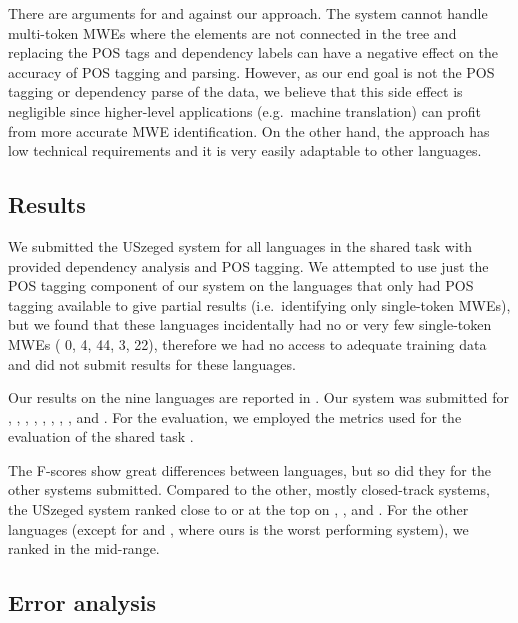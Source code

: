 \documentclass[output=paper,
modfonts,
]{langscibook}
\begin{document}
There are arguments for and against our approach. The system cannot handle multi-token MWEs where the elements are not connected in the tree and replacing the POS tags and dependency labels can have a negative effect on the accuracy of POS tagging and parsing. However, as our end goal is not the POS tagging or dependency parse of the data, we believe that this side effect is negligible since higher-level applications (e.g.~machine translation) can profit from more accurate MWE identification. On the other hand, the approach has low technical requirements and it is very easily adaptable to other languages.


\subsection{Results}

We submitted the USzeged system for all languages in the shared task with provided dependency analysis and POS tagging. We attempted to use just the POS tagging component of our system on the languages that only had POS tagging available to give partial results (i.e.~identifying only single-token MWEs), but we found that these languages incidentally had no or very few single-token MWEs ( 0,  4,  44,  3,  22), therefore we had no access to adequate training data and did not submit results for these languages.

Our results on the nine languages are reported in \cite{Simko2017}. Our system was submitted for , , , , , , , , and . For the evaluation, we employed the metrics used for the evaluation of the shared task \citep{MWEWorkshop}.


The F-scores show great differences between languages, but so did they for the other systems submitted.
Compared to the other, mostly closed-track systems, the USzeged system ranked close to or at the top on , , and . For the other languages (except for  and , where ours is the worst performing system), we ranked in the mid-range. 

\subsection{Error analysis}
\end{document}

